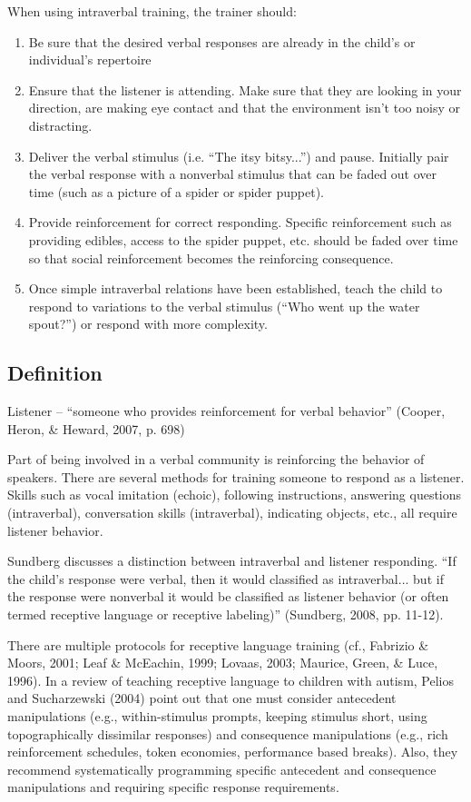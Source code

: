 When using intraverbal training, the trainer should:
\begin{enumerate}
\item Be sure that the desired verbal responses are already in the child's or individual's repertoire
\item Ensure that the listener is attending.  Make sure that they are looking in your direction, are making eye contact and that the environment isn't too noisy or distracting.
\item Deliver the verbal stimulus (i.e. ``The itsy bitsy...'') and pause.  Initially pair the verbal response with a nonverbal stimulus that can be faded out over time (such as a picture of a spider or spider puppet).
\item Provide reinforcement for correct responding. Specific reinforcement such as providing edibles, access to the spider puppet, etc. should be faded over time so that social reinforcement becomes the reinforcing consequence.  
\item Once simple intraverbal relations have been established, teach the child to respond to variations to the verbal stimulus (``Who went up the water spout?'') or respond with more complexity.    
\end{enumerate}
%
\subsection{Definition}
Listener – ``someone who provides reinforcement for verbal behavior'' (Cooper, Heron, \& Heward, 2007, p. 698)

Part of being involved in a verbal community is reinforcing the behavior of speakers. There are several methods for training someone to respond as a listener. Skills such as vocal imitation (echoic), following instructions, answering questions (intraverbal), conversation skills (intraverbal), indicating objects, etc., all require listener behavior. 

Sundberg discusses a distinction between intraverbal and listener responding. ``If the child's response were verbal, then it would classified as intraverbal... but if the response were nonverbal it would be classified as listener behavior (or often termed receptive language or receptive labeling)'' (Sundberg, 2008, pp. 11-12).

There are multiple protocols for receptive language training (cf., Fabrizio \& Moors, 2001; Leaf \& McEachin, 1999; Lovaas, 2003; Maurice, Green, \& Luce, 1996). In a review of teaching receptive language to children with autism, Pelios and Sucharzewski (2004) point out that one must consider antecedent manipulations (e.g., within-stimulus prompts, keeping stimulus short, using topographically dissimilar responses) and consequence manipulations (e.g., rich reinforcement schedules, token economies, performance based breaks).  Also, they recommend systematically programming specific antecedent and consequence manipulations and requiring specific response requirements.

